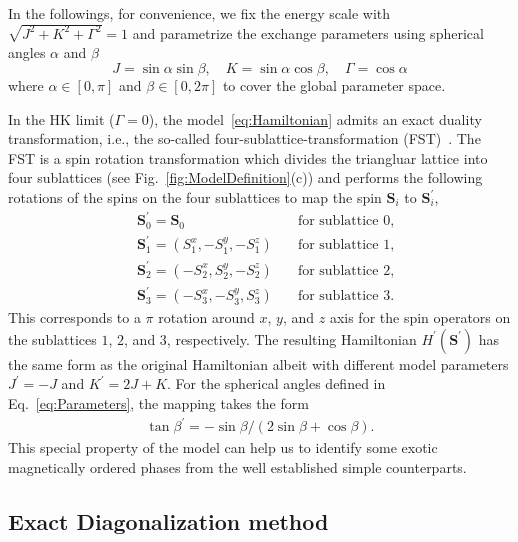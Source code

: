 \documentclass[aps,prb,reprint,amsfonts,amsmath,amssymb,showpacs,groupedaddress,superscriptaddress]{revtex4-1}
\begin{document}
In the followings, for convenience, we fix the energy scale with $\sqrt{J^2 + K^2 + \Gamma^2}=1$ and parametrize the exchange parameters using spherical angles $\alpha$ and $\beta$
\begin{equation}
    J = \sin\alpha \sin\beta, \quad
    K = \sin\alpha \cos\beta, \quad
    \Gamma = \cos\alpha
    \label{eq:Parameters}
\end{equation}
where $\alpha \in [0, \pi]$ and $\beta \in [0, 2\pi]$ to cover the global parameter space.

In the HK limit ($\Gamma=0$), the model~\eqref{eq:Hamiltonian} admits an exact duality transformation, i.e., the so-called four-sublattice-transformation (FST)~\cite{PhysRevB.89.014414}. The FST is a spin rotation transformation which divides the triangluar lattice into four sublattices (see Fig.~\ref{fig:ModelDefinition}(c)) and performs the following rotations of the spins on the four sublattices to map the spin $\bm{S}_{i}$ to $\bm{S}_{i}^{\prime}$,
\begin{align*}
    & \bm{S}_{0}^{\prime} = \bm{S}_{0}& \quad \text{for sublattice 0}, \\
    & \bm{S}_{1}^{\prime} = (S_1^x, -S_1^y, -S_1^z)& \quad \text{for sublattice 1}, \\
    & \bm{S}_{2}^{\prime} = (-S_2^x, S_2^y, -S_2^z)& \quad \text{for sublattice 2}, \\
    & \bm{S}_{3}^{\prime} = (-S_3^x, -S_3^y, S_3^z)& \quad \text{for sublattice 3}.
\end{align*}
This corresponds to a $\pi$ rotation around $x$, $y$, and $z$ axis for the spin operators on the sublattices $1$, $2$, and $3$, respectively. The resulting Hamiltonian $H^{\prime}(\bm{S}^{\prime})$ has the same form as the original Hamiltonian albeit with different model parameters $J^{\prime} = -J$ and $K^{\prime} = 2J + K$. For the spherical angles defined in Eq.~\eqref{eq:Parameters}, the mapping takes the form
\begin{align}
    \tan\beta^{\prime} = -\sin\beta / (2\sin\beta + \cos\beta).
    \label{eq:FST}
\end{align}
This special property of the model can help us to identify some exotic magnetically ordered phases from the well established simple counterparts.


\subsection{\label{subsec:MethodED}Exact Diagonalization method}
\end{document}
